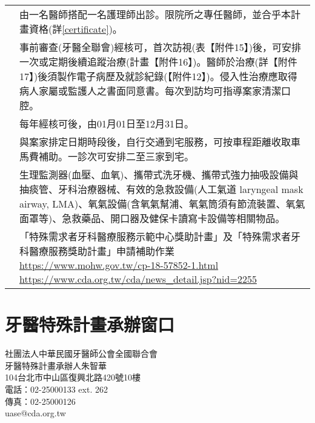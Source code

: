 \begin{longtable}{p{1.3in}p{4.8in}}

\color{OliveGreen}{人力須求}
 & 由一名醫師搭配一名護理師出診。限院所之專任醫師，並合乎本計畫資格(詳\ref{certificate})。\\
 
\color{OliveGreen}{服務內容}
 & 事前審查(牙醫全聯會)經核可，首次訪視(表【附件15】)後，可安排一次或定期後續追蹤治療(計畫【附件16】)。醫師於治療(詳【附件17】)後須製作電子病歷及就診紀錄(【附件12】)。侵入性治療應取得病人家屬或監護人之書面同意書。每次到訪均可指導案家清潔口腔。\\

\color{OliveGreen}{計畫期程}
& 每年經核可後，由01月01日至12月31日。\\
 
\color{OliveGreen}{服務場所}
& 與案家排定日期時段後，自行交通到宅服務，可按車程距離收取車馬費補助。一診次可安排二至三家到宅。\\

\color{OliveGreen}{設備須求}
& 生理監測器(血壓、血氧)、攜帶式洗牙機、攜帶式強力抽吸設備與抽痰管、牙科治療器械、有效的急救設備(人工氣道 laryngeal mask airway, LMA)、氧氣設備(含氧氣幫浦、氧氣筒須有節流裝置、氧氣面罩等)、急救藥品、開口器及健保卡讀寫卡設備等相關物品。\\

\color{OliveGreen}{計畫經費}
&「特殊需求者牙科醫療服務示範中心獎助計畫」及「特殊需求者牙科醫療服務獎助計畫」申請補助作業
\url{https://www.mohw.gov.tw/cp-18-57852-1.html}
\url{https://www.cda.org.tw/cda/news_detail.jsp?nid=2255}\\

\end{longtable}


%
\section{牙醫特殊計畫承辦窗口}
\noindent 社團法人中華民國牙醫師公會全國聯合會\\
牙醫特殊計畫承辦人朱智華\\
104台北市中山區復興北路420號10樓\\
電話：02-25000133 ext. 262\\
傳真：02-25000126\\
uase@cda.org.tw\\